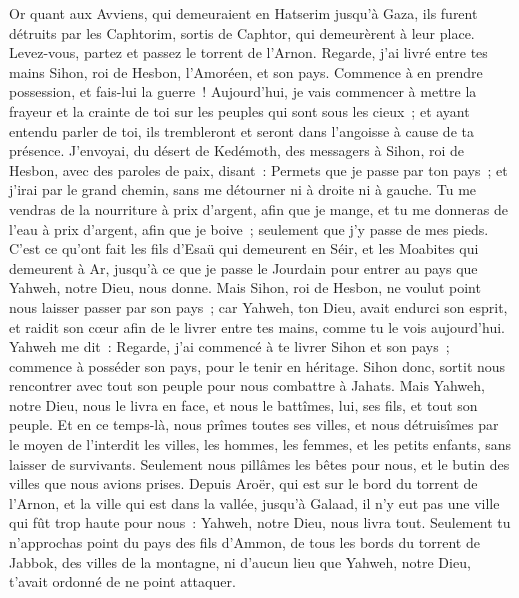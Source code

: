 \begin{multicols}{2}
Or quant aux Avviens, qui demeuraient en Hatserim jusqu'à Gaza, ils furent détruits par les Caphtorim, sortis de Caphtor, qui demeurèrent à leur place.
Levez-vous, partez et passez le torrent de l'Arnon. Regarde, j'ai livré entre tes mains Sihon, roi de Hesbon, l'Amoréen, et son pays. Commence à en prendre possession, et fais-lui la guerre~!
Aujourd'hui, je vais commencer à mettre la frayeur et la crainte de toi sur les peuples qui sont sous les cieux~; et ayant entendu parler de toi, ils trembleront et seront dans l'angoisse à cause de ta présence.
J'envoyai, du désert de Kedémoth, des messagers à Sihon, roi de Hesbon, avec des paroles de paix, disant~:
Permets que je passe par ton pays~; et j'irai par le grand chemin, sans me détourner ni à droite ni à gauche.
Tu me vendras de la nourriture à prix d'argent, afin que je mange, et tu me donneras de l'eau à prix d'argent, afin que je boive~; seulement que j'y passe de mes pieds.
C'est ce qu'ont fait les fils d'Esaü qui demeurent en Séir, et les Moabites qui demeurent à Ar, jusqu'à ce que je passe le Jourdain pour entrer au pays que Yahweh, notre Dieu, nous donne.
Mais Sihon, roi de Hesbon, ne voulut point nous laisser passer par son pays~; car Yahweh, ton Dieu, avait endurci son esprit, et raidit son cœur afin de le livrer entre tes mains, comme tu le vois aujourd'hui.
Yahweh me dit~: Regarde, j'ai commencé à te livrer Sihon et son pays~; commence à posséder son pays, pour le tenir en héritage.
Sihon donc, sortit nous rencontrer avec tout son peuple pour nous combattre à Jahats.
Mais Yahweh, notre Dieu, nous le livra en face, et nous le battîmes, lui, ses fils, et tout son peuple.
Et en ce temps-là, nous prîmes toutes ses villes, et nous détruisîmes par le moyen de l'interdit les villes, les hommes, les femmes, et les petits enfants, sans laisser de survivants.
Seulement nous pillâmes les bêtes pour nous, et le butin des villes que nous avions prises.
Depuis Aroër, qui est sur le bord du torrent de l'Arnon, et la ville qui est dans la vallée, jusqu'à Galaad, il n'y eut pas une ville qui fût trop haute pour nous~: Yahweh, notre Dieu, nous livra tout.
Seulement tu n'approchas point du pays des fils d'Ammon, de tous les bords du torrent de Jabbok, des villes de la montagne, ni d'aucun lieu que Yahweh, notre Dieu, t'avait ordonné de ne point attaquer.

\end{multicols}
